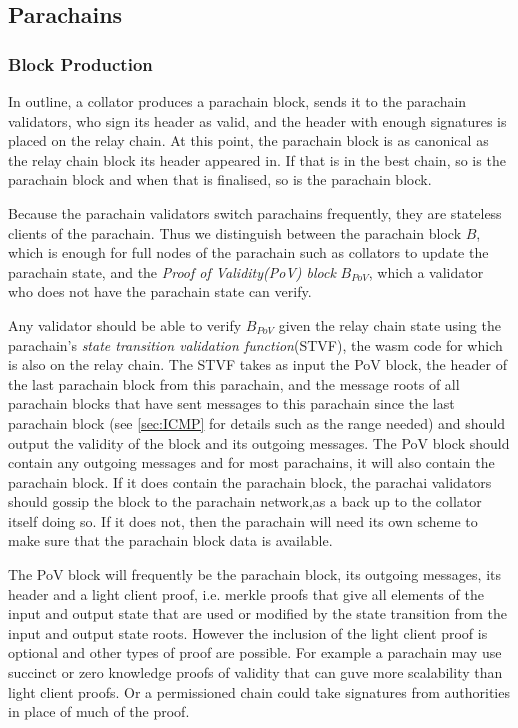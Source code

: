 \subsection{Parachains}

\subsubsection{Block Production}\label{sec:parachainblockproduction}
In outline, a collator produces a parachain block, sends it to the parachain validators, who sign its header as valid, and the header with enough signatures is placed on the relay chain. At this point, the parachain block is as canonical as the relay chain block its header appeared in. If that is in the best chain, so is the parachain block and when that is finalised, so is the parachain block.

Because the parachain validators switch parachains frequently, they are stateless clients of the parachain. Thus we distinguish between the parachain block $B$, which is enough for full nodes of the parachain such as collators to update the parachain state, and the {\em Proof of Validity(PoV) block} $B_{PoV}$, which a validator who does not have the parachain state can verify.

Any validator should be able to verify $B_{PoV}$ given the relay chain state using the parachain's {\em state transition validation function}(STVF), the wasm code for which is also on the relay chain. The STVF takes as input the PoV block, the header of the last parachain block from this parachain, and the message roots of all parachain blocks that have sent messages to this parachain since the last parachain block (see \ref{sec:ICMP} for details such as the range needed) and should output the validity of the block and its outgoing messages. The PoV block should contain any outgoing messages and for most parachains, it will also contain the parachain block. If it does contain the parachain block, the parachai validators should gossip the block to the parachain network,as a back up to the collator itself doing so. If it does not, then the parachain will need its own scheme to make sure that the parachain block data is available.

The PoV block will frequently be the parachain block, its outgoing messages, its header and a light client proof, i.e. merkle proofs that give all elements of the input and output state that are used or modified by the state transition from the input and output state roots. However the inclusion of the light client proof is optional and other types of proof are possible. For example a parachain may use succinct or zero knowledge proofs of validity that can guve more scalability than light client proofs. Or a permissioned chain could take signatures from authorities in place of much of the proof.

